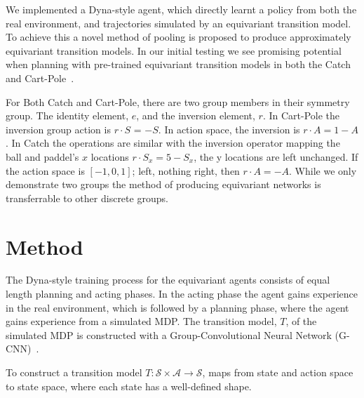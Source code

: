 \documentclass[mlabstract]{jmlr}
\begin{document}
We implemented a Dyna-style agent, which directly learnt a policy from both the real environment, and trajectories simulated by an equivariant transition model. To achieve this a novel method of pooling is proposed to produce approximately equivariant transition models. In our initial testing we see promising potential when planning with pre-trained equivariant transition models in both the Catch~\cite{osband2020bsuite} and Cart-Pole~\cite{barto1983neuronlike, florian2007correct}.

For Both Catch and Cart-Pole, there are two group members in their symmetry group. The identity element, $e$, and the inversion element, $r$. In Cart-Pole the inversion group action is $r \cdot S$ = $ - S$. In action space, the inversion is $r \cdot A = 1 - A$. In Catch the operations are similar with the inversion operator mapping the ball and paddel's $x$ locations $r \cdot S_x = 5- S_x$, the y locations are left unchanged. If the action space is $[-1, 0, 1]$; left, nothing right, then $r \cdot A = - A$. While we only demonstrate two groups the method of producing equivariant networks is transferrable to other discrete groups.

\section{Method}
The Dyna-style training process for the equivariant agents consists of equal length planning and acting phases. In the acting phase the agent gains experience in the real environment, which is followed by a planning phase, where the agent gains experience from a simulated MDP. The transition model, $T$, of the simulated MDP is constructed with a Group-Convolutional Neural Network (G-CNN)~\cite{cohen2016group}.

To construct a transition model $T: \mathcal{S} \times \mathcal{A} \rightarrow \mathcal{S}$, maps from state and action space to state space, where each state has a well-defined shape.
\end{document}
